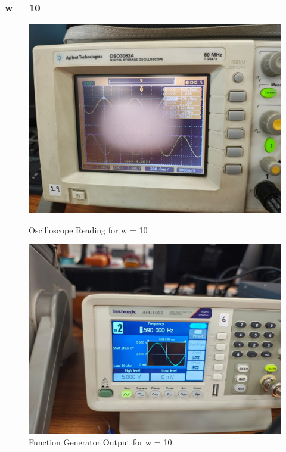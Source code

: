 \documentclass[a4paper,12pt]{article}
\begin{document}
\subsubsection{w = 10}
\begin{figure}[H]
    \centering
    \begin{minipage}{0.48\textwidth}
        \centering
        \includegraphics[width=\textwidth]{fig/3w10o.jpeg} %
        \caption{Oscilloscope Reading for w = 10}
    \end{minipage}
    \hfill
    \begin{minipage}{0.48\textwidth}
        \centering
        \includegraphics[width=\textwidth]{fig/3w10.jpeg} %
        \caption{Function Generator Output for w = 10}
    \end{minipage}
\end{figure}
\end{document}
